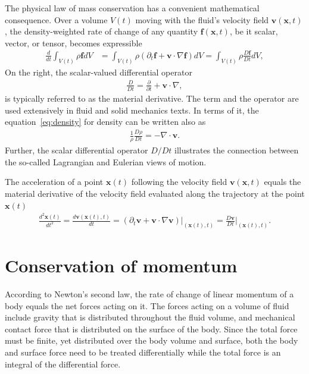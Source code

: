 The physical law of mass conservation has a convenient mathematical consequence. Over a volume $V(t)$ moving with the fluid's velocity field $\bm{v}(\bm{x},t)$, the density-weighted rate of change of any quantity $\bm{f}(\bm{x},t)$, be it scalar, vector, or tensor, becomes expressible
\begin{align}\label{eq:rho-identity}
    \frac{d}{dt}\int_{V(t)}\rho \bm{f} dV
    &=\int_{V(t)}\rho\left(\partial_t\bm{f}+\bm{v}\cdot\nabla \bm{f}\right)dV
    =\int_{V(t)}\rho\frac{D\bm{f}}{Dt}dV,
\end{align}
On the right, the scalar-valued differential operator 
\begin{align}\label{eq:material-derivative}
    \frac{D}{Dt}=\frac{\partial}{\partial t}+\bm{v}\cdot\nabla,
\end{align}
is typically referred to as the material derivative. The term and the operator are used extensively in fluid and solid mechanics texts. In terms of it, the equation~\eqref{eq:density} for density can be written also as
\begin{align}
    \frac{1}{\rho}\frac{D\rho}{Dt}=-\nabla\cdot\bm{v}.
\end{align}
Further, the scalar differential operator $D/Dt$ illustrates the connection between the so-called Lagrangian and Eulerian views of motion. 
\begin{example}
    The acceleration of a point $\bm{x}(t)$ following the velocity field $\bm{v}(\bm{x},t)$ equals the material derivative of the velocity field evaluated along the trajectory at the point $\bm{x}(t)$
    \begin{align*}
        \frac{d^2\bm{x}(t)}{dt^2}=\frac{d\bm{v}(\bm{x}(t),t)}{dt}=(\partial_t\bm{v}+\bm{v}\cdot\nabla\bm{v})\Big|_{(\bm{x}(t),t)}=\frac{D\bm{v}}{Dt}\Big|_{(\bm{x}(t),t)}.
    \end{align*}
\end{example}


\section{Conservation of momentum}
According to Newton's second law, the rate of change of linear momentum of a body equals the net forces acting on it. The forces acting on a volume of fluid include gravity that is distributed throughout the fluid volume, and mechanical contact force that is distributed on the surface of the body. Since the total force must be finite, yet distributed over the body volume and surface, both the body and surface force need to be treated differentially while the total force is an integral of the differential force. 

